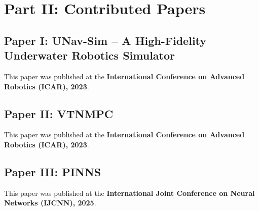\documentclass[
10pt, %
b5paper, %
twoside, %
openright  %
]{book}  %
\begin{document}
 
 
  

%
%
%

% 




\part*{Part II: Contributed Papers}
 \label{partII:paper}


\chapter*{Paper I: UNav-Sim – A High-Fidelity Underwater Robotics Simulator}
\vspace{1cm}
This paper was published at the \textbf{International Conference on Advanced Robotics (ICAR), 2023}.





\chapter*{Paper II: VTNMPC}
\vspace{1cm}
This paper was published at the \textbf{International Conference on Advanced Robotics (ICAR), 2023}.






\chapter*{Paper III: PINNS}
\vspace{1cm}
This paper was published at the \textbf{International Joint Conference on Neural Networks (IJCNN), 2025}.
\end{document}
